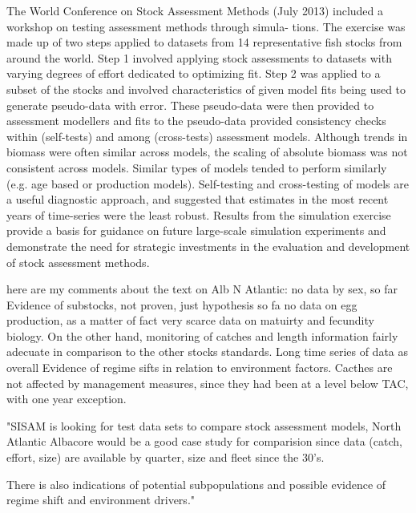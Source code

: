\documentclass[a4paper,10pt]{article}
\begin{document}
The World Conference on Stock Assessment Methods (July 2013) included a workshop on testing assessment methods through simula-
tions. The exercise was made up of two steps applied to datasets from 14 representative fish stocks from around the world. Step 1 involved
applying stock assessments to datasets with varying degrees of effort dedicated to optimizing fit. Step 2 was applied to a subset of the stocks
and involved characteristics of given model fits being used to generate pseudo-data with error. These pseudo-data were then provided to
assessment modellers and fits to the pseudo-data provided consistency checks within (self-tests) and among (cross-tests) assessment
models. Although trends in biomass were often similar across models, the scaling of absolute biomass was not consistent across
models. Similar types of models tended to perform similarly (e.g. age based or production models). Self-testing and cross-testing
of models are a useful diagnostic approach, and suggested that estimates in the most recent years of time-series were the least robust.
Results from the simulation exercise provide a basis for guidance on future large-scale simulation experiments and demonstrate the
need for strategic investments in the evaluation and development of stock assessment methods.


here are my comments  about the text on Alb N Atlantic:
no data by sex, so far
Evidence of substocks, not  proven, just hypothesis so fa
no data on egg production, as a matter of fact very scarce data on matuirty and fecundity biology.
On the other hand, monitoring of catches and length information fairly adecuate in comparison to the other stocks standards.
Long time series of data as overall
Evidence of  regime sifts in relation to environment factors.
Cacthes are  not affected by management measures, since they had been at a level  below TAC, with one year exception.


 
"SISAM is looking for test data sets to compare stock assessment models,
North Atlantic Albacore would be a good case study for
comparision since data (catch, effort, size) are available by quarter, size and fleet since the 30’s.

There is also indications of potential subpopulations and possible evidence of regime
shift and environment drivers."
\end{document}
